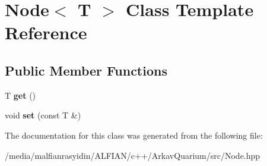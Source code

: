 \hypertarget{class_node}{}\section{Node$<$ T $>$ Class Template Reference}
\label{class_node}
\subsection*{Public Member Functions}
\begin{DoxyCompactItemize}
\item 
\mbox{\label{class_node_a773c2262bb5c0bcea27f3247bbc29fb7}} 
T {\bfseries get} ()
\item 
\mbox{\label{class_node_a73471424bb2d3e7f7790b812a21588e3}} 
void {\bfseries set} (const T \&)
\end{DoxyCompactItemize}


The documentation for this class was generated from the following file\+:\begin{DoxyCompactItemize}
\item 
/media/malfianrasyidin/\+A\+L\+F\+I\+A\+N/c++/\+Arkav\+Quarium/src/Node.\+hpp\end{DoxyCompactItemize}

